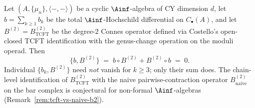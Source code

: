 \begin{theorem}
\label{thm:total-ainf-compat}
\ClaimStatusProvedHere{}
Let $(A, \{\mu_n\}, \langle -,- \rangle)$ be a cyclic
$\Ainf$-algebra of CY dimension $d$, let
$b = \sum_{k \geq 1} b_k$ be the total $\Ainf$-Hochschild
differential on $C_\bullet(A)$, and let
$B^{(2)} = B^{(2)}_{\mathrm{TCFT}}$ be the degree-$2$ Connes
operator defined via Costello's open-closed TCFT
identification with the genus-change operation on the moduli
operad.  Then
\[
 \{b, B^{(2)}\} \;=\; b \circ B^{(2)} + B^{(2)} \circ b
 \;=\; 0.
\]
Individual $\{b_k, B^{(2)}\}$ need \emph{not} vanish for
$k \geq 3$; only their sum does.  The chain-level
identification of $B^{(2)}_{\mathrm{TCFT}}$ with the naive
pairwise-contraction operator $B^{(2)}_{\mathrm{naive}}$ on
the bar complex is conjectural for non-formal $\Ainf$-algebras
(Remark~\ref{rem:tcft-vs-naive-b2}).
\end{theorem}

